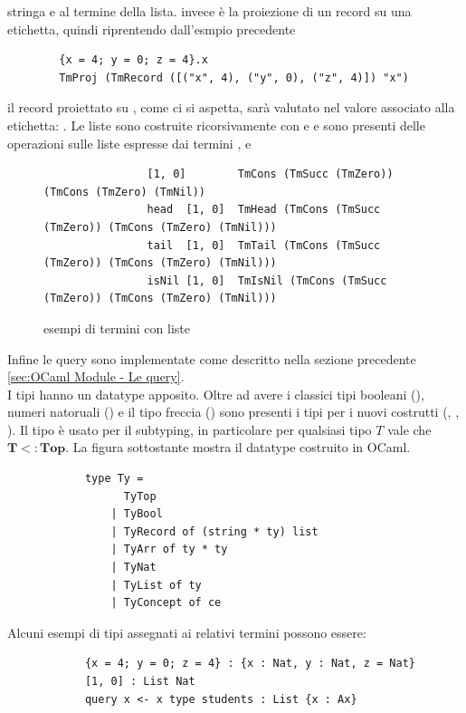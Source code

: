         stringa e al termine della lista.  invece è la proiezione di un record su una etichetta, quindi riprentendo dall'esmpio precedente 
        \begin{verbatim}
        {x = 4; y = 0; z = 4}.x 
        TmProj (TmRecord ([("x", 4), ("y", 0), ("z", 4)]) "x")
        \end{verbatim}
        il record proiettato su , come ci si aspetta, sarà valutato nel valore associato alla etichetta: .
        Le liste sono costruite ricorsivamente con  e  e sono presenti delle operazioni sulle liste espresse dai termini ,
         e 
        \begin{figure}[h]
            \begin{verbatim}
                [1, 0]        TmCons (TmSucc (TmZero)) (TmCons (TmZero) (TmNil))
                head  [1, 0]  TmHead (TmCons (TmSucc (TmZero)) (TmCons (TmZero) (TmNil)))
                tail  [1, 0]  TmTail (TmCons (TmSucc (TmZero)) (TmCons (TmZero) (TmNil)))
                isNil [1, 0]  TmIsNil (TmCons (TmSucc (TmZero)) (TmCons (TmZero) (TmNil)))
            \end{verbatim}
        \caption{esempi di termini con liste}
        \end{figure}
        Infine le query sono implementate come descritto nella sezione precedente \ref{sec:OCaml Module - Le query}.
        \\I tipi hanno un datatype apposito. Oltre ad avere i classici tipi booleani (), numeri natoruali () e il tipo freccia () 
        sono presenti i tipi per i nuovi costrutti (, , ). Il tipo  è usato per il subtyping, in particolare per
        qualsiasi tipo $T$ vale che $\boldsymbol{T <: Top}$. La figura sottostante mostra il datatype costruito in OCaml.
        \begin{verbatim}
            type Ty =
                  TyTop 
                | TyBool 
                | TyRecord of (string * ty) list 
                | TyArr of ty * ty 
                | TyNat 
                | TyList of ty
                | TyConcept of ce
        \end{verbatim}
        Alcuni esempi di tipi assegnati ai relativi termini possono essere:
        \begin{verbatim}
            {x = 4; y = 0; z = 4} : {x : Nat, y : Nat, z = Nat}
            [1, 0] : List Nat
            query x <- x type students : List {x : Ax}
        \end{verbatim}
